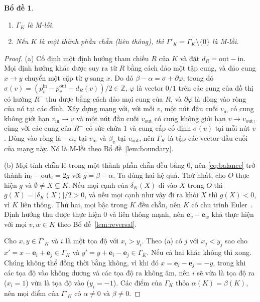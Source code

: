 \documentclass[pdflatex,sn-mathphys-num]{sn-jnl}
\theoremstyle{thmstyleone}%
\newtheorem{lemma}[theorem]{Bổ đề}%
\theoremstyle{thmstyletwo}%
\theoremstyle{thmstylethree}%
\newcommand{\Z}{\mathbb{Z}}
\newcommand{\e}{\mathbf{e}}
\newcommand{\out}{\mathrm{out}}
\newcommand{\inn}{\mathrm{in}}
\newcommand{\abs}[1]{\lvert #1\rvert}
\begin{document}
\begin{lemma}\label{lem:gamma}
\begin{enumerate}
\item[(a)] $\Gamma_K$ là M-lồi.
\item[(b)] Nếu $K$ là một thành phần chẵn (liên thông), thì $\Gamma'_K=\Gamma_K\setminus\{0\}$ là M-lồi.
\end{enumerate}
\end{lemma}

\begin{proof}
(a) Cố định một định hướng tham chiếu $R$ của $K$ và đặt $d_R=\out-\inn$. Mọi định hướng khác được suy ra từ $R$ bằng cách đảo một tập cung, và đảo cung $x\to y$ chuyển một cặp từ $y$ sang $x$. Do đó $\beta-\alpha=\sigma+\partial\varphi$, trong đó $\sigma(v)=(p^{\inn}_v-p^{\out}_v-d_R(v))/2\in\Z$, $\varphi$ là vector $0/1$ trên các cung của đồ thị có hướng $R^-$ thu được bằng cách đảo mọi cung của $R$, và $\partial\varphi$ là dòng vào ròng của nó tại các đỉnh. Xây dựng mạng với, với mỗi $v$, một nút đầu cuối $v_{\inn}$ có cung không giới hạn $v_{\inn}\to v$ và một nút đầu cuối $v_{\out}$ có cung không giới hạn $v\to v_{\out}$, cùng với các cung của $R^-$ có sức chứa $1$ và cung cấp cố định $\sigma(v)$ tại mỗi nút $v$. Dòng vào ròng là $-\alpha_v$ tại $v_{\inn}$ và $\beta_v$ tại $v_{\out}$, nên $\Gamma_K$ là tập các vector đầu cuối của mạng này. Nó là M-lồi theo Bổ đề~\ref{lem:boundary}.

(b) Mọi tính chẵn lẻ trong một thành phần chẵn đều bằng $0$, nên \eqref{eq:balance} trở thành $\inn_t-\out_t=2g$ với $g=\beta-\alpha$. Ta dùng hai hệ quả. Thứ nhất, cho $O$ thực hiện $g$ và $\emptyset\ne X\subsetneq K$. Nếu mọi cạnh của $\delta_K(X)$ đi vào $X$ trong $O$ thì $g(X)=\abs{\delta_K(X)}/2>0$, và nếu mọi cạnh như vậy đi ra khỏi $X$ thì $g(X)<0$, vì $K$ liên thông. Thứ hai, mọi bậc trong $K$ đều chẵn, nên $K$ có chu trình Euler~\cite{hierholzer1873}. Định hướng thu được thực hiện $0$ và liên thông mạnh, nên $\e_v-\e_w$ khả thực hiện với mọi $v,w\in K$ theo Bổ đề~\ref{lem:reversal}.

Cho $x,y\in\Gamma'_K$ và $i$ là một tọa độ với $x_i>y_i$. Theo (a) có $j$ với $x_j<y_j$ sao cho $x'=x-\e_i+\e_j\in\Gamma_K$ và $y'=y+\e_i-\e_j\in\Gamma_K$. Nếu cả hai khác không thì xong. Chúng không thể đồng thời bằng không, vì khi đó $x=\e_i-\e_j=-y$, trong khi các tọa độ vào không dương và các tọa độ ra không âm, nên $i$ sẽ vừa là tọa độ ra ($x_i=1$) vừa là tọa độ vào ($y_i=-1$). Các điểm của $\Gamma_K$ thỏa $\alpha(K)=\beta(K)$, nên mọi điểm của $\Gamma'_K$ có $\alpha\ne0$ và $\beta\ne0$.


\end{proof}
\end{document}
